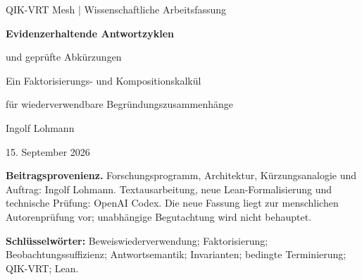 \documentclass[11pt,a4paper]{article}
\begin{document}
\thispagestyle{empty}
{\sffamily\color{inkblue}\large QIK-VRT Mesh | Wissenschaftliche Arbeitsfassung}\par
\vspace{8mm}
{\LARGE\bfseries Evidenzerhaltende Antwortzyklen\par und geprüfte Abkürzungen}\par
\vspace{4mm}
{\large Ein Faktorisierungs- und Kompositionskalkül\par für wiederverwendbare Begründungszusammenhänge}\par
\vspace{7mm}
{\large Ingolf Lohmann}\par
15. September 2026\par
\vspace{4mm}
\textbf{Beitragsprovenienz.} Forschungsprogramm, Architektur, Kürzungsanalogie und
Auftrag: Ingolf Lohmann. Textausarbeitung, neue Lean-Formalisierung und technische
Prüfung: OpenAI Codex. Die neue Fassung liegt zur menschlichen Autorenprüfung vor;
unabhängige Begutachtung wird nicht behauptet.

\begin{abstract}
Wiederkehrende Antwortprozesse können gemeinsame Begründungsstrukturen nutzen.
Diese Arbeit präzisiert, unter welchen Bedingungen eine solche Verkürzung die
deklarierte Antwortsemantik erhält. Ausgangspunkt ist der bereits im QIK-VRT-Kern
vorhandene Faktorisierungssatz: Eine Antwortfunktion lässt sich genau dann durch
einen Schlüssel auf dessen erreichbarem Bild darstellen, wenn sie auf jeder
Schlüsselfaser konstant ist. Eine additive Lean-4.19-Erweiterung verbindet dieses
Kriterium mit Fragenfamilien, Schlüsselverfeinerung, Komposition, kontextgebundener
Zertifikatsanwendung, Versionsbindung sowie Sicherheits- und Fortschrittsbedingungen
für Zyklen. Dreizehn benannte Sätze werden maschinell geprüft. Darin zeigt ein
Grenzsatz: Wer sämtliche unterscheidenden Fragen über einem Zustandsraum
bewahren will, muss einen injektiven Schlüssel verwenden. Ein Operationsmodell
liefert eine bedingte Einsparungsaussage. Die Ergebnisse gelten für explizite
mathematische Modelle; eine allgemeine Entscheidung aller offenen Fragen,
dauerhafte empirische Unfehlbarkeit und eine gemessene Beschleunigung des gesamten
Mesh folgen daraus nicht.
\end{abstract}

\textbf{Schlüsselwörter:} Beweiswiederverwendung; Faktorisierung; Beobachtungssuffizienz;
Antwortsemantik; Invarianten; bedingte Terminierung; QIK-VRT; Lean.
\end{document}
